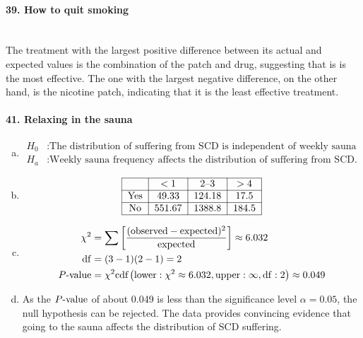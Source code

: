 \documentclass[../Homework]{subfiles}
\begin{document}
		\paragraph{39. How to quit smoking}\ \\
			The treatment with the largest positive difference between its actual and expected values is the combination of the patch and drug, suggesting that is is the most effective. The one with the largest negative difference, on the other hand, is the nicotine patch, indicating that it is the least effective treatment.
		\paragraph{41. Relaxing in the sauna}
			\begin{enumerate}[a.]
				\item
					\begin{align*}
						H_0&: \text{The distribution of suffering from SCD is independent of weekly sauna frequency.} \\
						H_a&: \text{Weekly sauna frequency affects the distribution of suffering from SCD.}
					\end{align*}
				\item
					\[\begin{tabular}{|c|c|c|c|}\hline
						& $<1$ & 2--3 & $>4$ \\\hline
						Yes & 49.33 & 124.18 & 17.5 \\\hline
						No & 551.67 & 1388.8 & 184.5 \\\hline
					\end{tabular}\]
				\item
					\begin{align*}
						\chi^2 &= \sum\left[\mathrm{\frac{(observed - expected)^2}{expected}}\right] \approx 6.032 \\
						\operatorname{df} &= (3 - 1)(2 - 1) = 2 \\
						P\text{-value} &= \chi^2\text{cdf}\left(\operatorname{lower}: \chi^2 \approx 6.032, \operatorname{upper}: \infty, \operatorname{df}: 2\right) \approx 0.049
					\end{align*}
				\item
					As the $P\text{-value}$ of about 0.049 is less than the significance level $\alpha = 0.05$, the null hypothesis can be rejected. The data provides convincing evidence that going to the sauna affects the distribution of SCD suffering.
			\end{enumerate}
\end{document}
